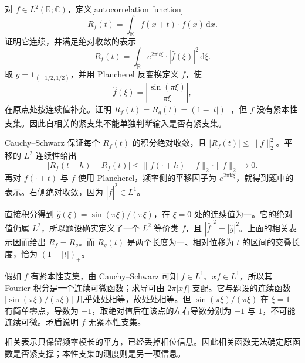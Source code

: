 \begin{optionalexercise}\label{b2:ex:20-new-5}
对 \(f\in L^2(\mathbb R;\mathbb C)\)，定义[autocorrelation function]
\[
 R_f(t)=\int_{\mathbb R}f(x+t)\cdot\overline{f(x)}\,\mathrm dx.
\]
证明它连续，并满足绝对收敛的表示
\[
 R_f(t)=\int_{\mathbb R}e^{2\pi\mathrm i t\xi}
                           \cdot|\widehat f(\xi)|^2\,\mathrm d\xi.
\]
取 \(g=\mathbf1_{(-1/2,1/2)}\)，并用 Plancherel 反变换定义 \(f\)，使
\[
 \widehat f(\xi)=\left|\frac{\sin(\pi\xi)}{\pi\xi}\right|,
\]
在原点处按连续值补充。证明 \(R_f(t)=R_g(t)=(1-|t|)_+\)，但 \(f\) 没有紧本性支集。因此自相关的紧支集不能单独判断输入是否有紧支集。
\end{optionalexercise}
\begin{solution}
Cauchy--Schwarz 保证每个 \(R_f(t)\) 的积分绝对收敛，且 \(|R_f(t)|\leq\|f\|_2^2\)。平移的 \(L^2\) 连续性给出
\[
 |R_f(t+h)-R_f(t)|
 \leq\|f(\cdot+h)-f\|_2\cdot\|f\|_2\longrightarrow0.
\]
再对 \(f(\cdot+t)\) 与 \(f\) 使用 Plancherel，频率侧的平移因子为 \(e^{2\pi\mathrm i t\xi}\)，就得到题中的表示。右侧绝对收敛，因为 \(|\widehat f|^2\in L^1\)。

直接积分得到
\(\widehat g(\xi)=\sin(\pi\xi)/(\pi\xi)\)，在 \(\xi=0\) 处的连续值为一。它的绝对值仍属 \(L^2\)，所以题设确实定义了一个 \(L^2\) 等价类 \(f\)，且 \(|\widehat f|^2=|\widehat g|^2\)。上面的相关表示因而给出 \(R_f=R_g\)。而 \(R_g(t)\) 是两个长度为一、相对位移为 \(t\) 的区间的交叠长度，恰为 \((1-|t|)_+\)。

假如 \(f\) 有紧本性支集，由 Cauchy--Schwarz 可知 \(f\in L^1\)、\(xf\in L^1\)，所以其 Fourier 积分是一个连续可微函数；求导可由 \(2\pi|xf|\) 支配。它与题设的连续函数 \(|\sin(\pi\xi)/(\pi\xi)|\) 几乎处处相等，故处处相等。但 \(\sin(\pi\xi)/(\pi\xi)\) 在 \(\xi=1\) 有简单零点，导数为 \(-1\)，取绝对值后在该点的左右导数分别为 \(-1\) 与 \(1\)，不可能连续可微。矛盾说明 \(f\) 无紧本性支集。

相关表示只保留频率模长的平方，已经丢掉相位信息。因此相关函数无法确定原函数是否紧支撑；本性支集的测度则是另一项信息。
\end{solution}


